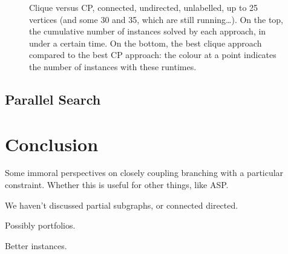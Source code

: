 \documentclass{llncs}
\begin{document}
\begin{figure}[p]
    \centering
    
    \caption{Clique versus CP, connected, undirected, unlabelled, up to 25 vertices (and some 30 and
        35, which are still running\ldots). On the top, the cumulative number of instances solved by
    each approach, in under a certain time. On the bottom, the best clique approach compared to the
best CP approach: the colour at a point indicates the number of instances with these runtimes.}
\label{figure:connected-plain}
\end{figure}

\subsection{Parallel Search}

\cite{DBLP:conf/ictai/MinotNS15}

\section{Conclusion}

Some immoral perspectives on closely coupling branching with a particular constraint. Whether this
is useful for other things, like ASP.

We haven't discussed partial subgraphs, or connected directed.

Possibly portfolios.

Better instances.

\FloatBarrier



\end{document}
